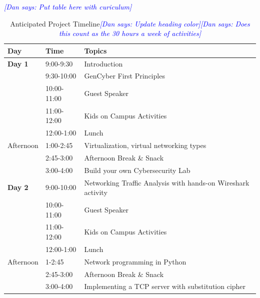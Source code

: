 \documentclass[12pt]{article}
\newcommand{\dan}[1]{\textcolor{blue}{{\it [Dan says: #1]}}}
\begin{document}
\dan{Put table here with curiculum}



\begin{table}[h]

\begin{center}
\caption{Anticipated Project Timeline\dan{Update heading color}\dan{Does this count as the 30 hours a week of activities}}
\label{Table:apkcontents}
  \begin{tabular}{| l | l | p{4.5in} | } \hline

  \bfseries Day & \bfseries Time & \bfseries Topics \\ \hline

\textbf{Day 1} &	9:00-9:30	& Introduction \\ \hline
	& 9:30-10:00 &	GenCyber First Principles \\ \hline
	& 10:00-11:00 &	Guest Speaker \\ \hline
	& 11:00-12:00 &	Kids on Campus Activities \\ \hline
	& 12:00-1:00 &	Lunch \\ \hline
Afternoon &	1:00-2:45 &	Virtualization, virtual networking types \\ \hline
    & 2:45-3:00 &	Afternoon Break \& Snack \\ \hline
	& 3:00-4:00	& Build your own Cybersecurity Lab \\ \hline \hline


\textbf{Day 2}	& 9:00-10:00 &	Networking Traffic Analysis with hands-on Wireshark activity \\ \hline
	& 10:00-11:00 &	Guest Speaker \\ \hline
	& 11:00-12:00 &	Kids on Campus Activities \\ \hline
	& 12:00-1:00 &	Lunch \\ \hline
Afternoon &	1-2:45 &	Network programming in Python \\ \hline
    & 2:45-3:00 &	Afternoon Break \& Snack \\ \hline
	& 3:00-4:00 &	Implementing a TCP server with substitution cipher \\ \hline \hline




\end{tabular}
\end{center}
\end{table}
\end{document}
